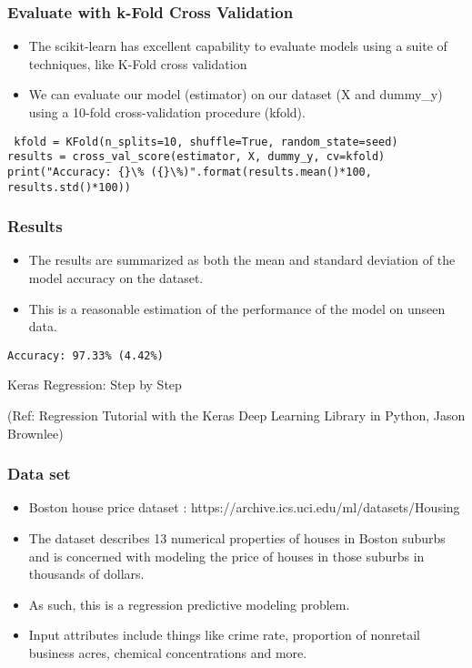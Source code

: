 \begin{frame}[fragile] \frametitle{Evaluate with k-Fold Cross Validation}
 \begin{itemize}
 \item  The scikit-learn has excellent capability to evaluate models using a suite of techniques, like K-Fold cross validation
 \item We can evaluate our model (estimator) on our dataset (X and dummy\_y) using a 10-fold cross-validation procedure (kfold).
 \end{itemize}
 \begin{lstlisting}
 kfold = KFold(n_splits=10, shuffle=True, random_state=seed)
results = cross_val_score(estimator, X, dummy_y, cv=kfold)
print("Accuracy: {}\% ({}\%)".format(results.mean()*100, results.std()*100))
\end{lstlisting}
\end{frame}

\begin{frame}[fragile] \frametitle{Results}
 \begin{itemize}
 \item  The results are summarized as both the mean and standard deviation of the model accuracy on the dataset.
 \item  This is a reasonable estimation of the performance of the model on unseen data.
 \end{itemize}
 \begin{lstlisting}
Accuracy: 97.33% (4.42%)
\end{lstlisting}
\end{frame}

\begin{frame}
  \begin{center}
    {\Large Keras Regression: Step by Step}
    
    \tiny{(Ref:  Regression Tutorial with the Keras Deep Learning Library in Python, Jason Brownlee)}
  \end{center}
\end{frame}


\begin{frame}[fragile] \frametitle{Data set}
 \begin{itemize}
 \item   Boston house price dataset : https://archive.ics.uci.edu/ml/datasets/Housing
 \item  The dataset describes 13 numerical properties of houses in Boston suburbs and is concerned with modeling the price of houses in those suburbs in thousands of dollars. 
 \item As such, this is a regression predictive modeling problem. 
 \item Input attributes include things like crime rate, proportion of nonretail business acres, chemical concentrations and more.
\end{itemize}
\end{frame}

